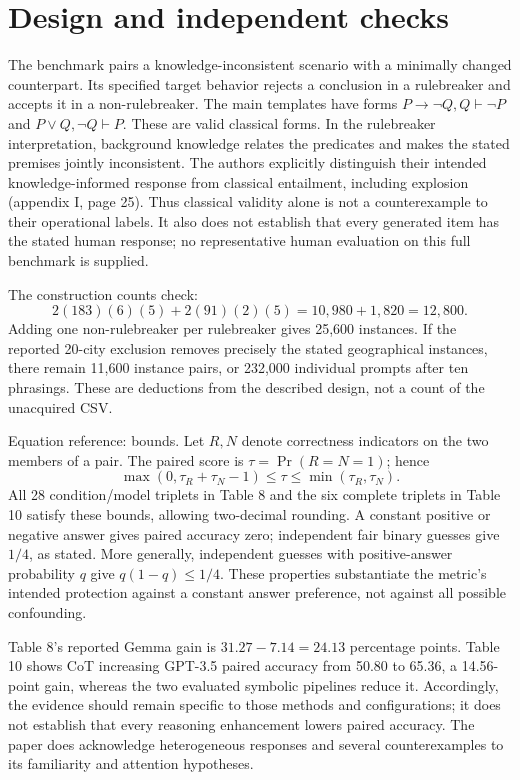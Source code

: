 \documentclass[10pt]{article}
\begin{document}
\section*{Design and independent checks}
The benchmark pairs a knowledge-inconsistent scenario with a minimally changed counterpart. Its specified target behavior rejects a conclusion in a rulebreaker and accepts it in a non-rulebreaker. The main templates have forms \(P\to\neg Q,Q\vdash\neg P\) and \(P\lor Q,\neg Q\vdash P\). These are valid classical forms. In the rulebreaker interpretation, background knowledge relates the predicates and makes the stated premises jointly inconsistent. The authors explicitly distinguish their intended knowledge-informed response from classical entailment, including explosion (appendix I, page 25). Thus classical validity alone is not a counterexample to their operational labels. It also does not establish that every generated item has the stated human response; no representative human evaluation on this full benchmark is supplied.\par
The construction counts check: \[2(183)(6)(5)+2(91)(2)(5)=10{,}980+1{,}820=12{,}800.\] Adding one non-rulebreaker per rulebreaker gives 25,600 instances. If the reported 20-city exclusion removes precisely the stated geographical instances, there remain 11,600 instance pairs, or 232,000 individual prompts after ten phrasings. These are deductions from the described design, not a count of the unacquired CSV.\par
Equation reference: bounds. Let \(R,N\) denote correctness indicators on the two members of a pair. The paired score is \(\tau=\Pr(R=N=1)\); hence \[
 \max(0,\tau_R+\tau_N-1)\leq\tau\leq\min(\tau_R,\tau_N).\] All 28 condition/model triplets in Table 8 and the six complete triplets in Table 10 satisfy these bounds, allowing two-decimal rounding. A constant positive or negative answer gives paired accuracy zero; independent fair binary guesses give \(1/4\), as stated. More generally, independent guesses with positive-answer probability \(q\) give \(q(1-q)\leq1/4\). These properties substantiate the metric’s intended protection against a constant answer preference, not against all possible confounding.\par
Table 8’s reported Gemma gain is \(31.27-7.14=24.13\) percentage points. Table 10 shows CoT increasing GPT-3.5 paired accuracy from 50.80 to 65.36, a 14.56-point gain, whereas the two evaluated symbolic pipelines reduce it. Accordingly, the evidence should remain specific to those methods and configurations; it does not establish that every reasoning enhancement lowers paired accuracy. The paper does acknowledge heterogeneous responses and several counterexamples to its familiarity and attention hypotheses.\par
\end{document}
